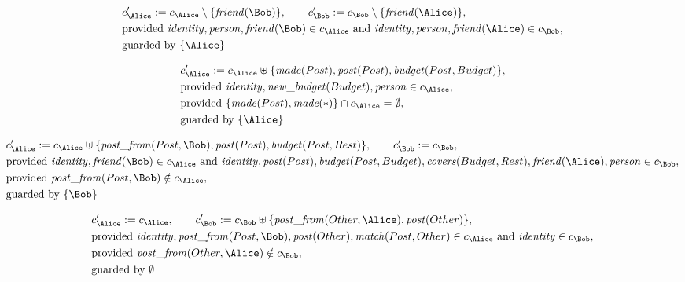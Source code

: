\begin{align*}
&
c'_
{
\Alice
}
 := 
c_
{
\Alice
}
 \setminus 
\{
\mathit{\detokenize{
friend
}}
(
\Bob
)
\}
, \qquad 
c'_
{
\Bob
}
 := 
c_
{
\Bob
}
 \setminus 
\{
\mathit{\detokenize{
friend
}}
(
\Alice
)
\}
,\\
&
\text{provided } 
\mathit{\detokenize{
identity
}}
,
\mathit{\detokenize{
person
}}
,
\mathit{\detokenize{
friend
}}
(
\Bob
)
 \in c_
{
\Alice
}
 \text{ and } 
\mathit{\detokenize{
identity
}}
,
\mathit{\detokenize{
person
}}
,
\mathit{\detokenize{
friend
}}
(
\Alice
)
 \in c_
{
\Bob
}
,\\
&
\text{guarded by } \{
\Alice
\}
\end{align*}

\begin{align*}
&
c'_
{
\Alice
}
 := 
c_
{
\Alice
}
 \uplus 
\{
\mathit{\detokenize{
made
}}
(
Post
)
,
\mathit{\detokenize{
post
}}
(
Post
)
,
\mathit{\detokenize{
budget
}}
(
Post
,
Budget
)
\}
,\\
&
\text{provided } 
\mathit{\detokenize{
identity
}}
,
\mathit{\detokenize{
new_budget
}}
(
Budget
)
,
\mathit{\detokenize{
person
}}
 \in c_
{
\Alice
}
,\\
&
\text{provided } 
\{
\mathit{\detokenize{
made
}}
(
Post
)
,
\mathit{\detokenize{
made
}}
(
\ast
)
\}
 \cap c_
{
\Alice
}
 = \emptyset
,\\
&
\text{guarded by } \{
\Alice
\}
\end{align*}

\begin{align*}
&
c'_
{
\Alice
}
 := 
c_
{
\Alice
}
 \uplus 
\{
\mathit{\detokenize{
post_from
}}
(
Post
,
\Bob
)
,
\mathit{\detokenize{
post
}}
(
Post
)
,
\mathit{\detokenize{
budget
}}
(
Post
,
Rest
)
\}
, \qquad 
c'_
{
\Bob
}
 := 
c_
{
\Bob
}
,\\
&
\text{provided } 
\mathit{\detokenize{
identity
}}
,
\mathit{\detokenize{
friend
}}
(
\Bob
)
 \in c_
{
\Alice
}
 \text{ and } 
\mathit{\detokenize{
identity
}}
,
\mathit{\detokenize{
post
}}
(
Post
)
,
\mathit{\detokenize{
budget
}}
(
Post
,
Budget
)
,
\mathit{\detokenize{
covers
}}
(
Budget
,
Rest
)
,
\mathit{\detokenize{
friend
}}
(
\Alice
)
,
\mathit{\detokenize{
person
}}
 \in c_
{
\Bob
}
,\\
&
\text{provided } 
\mathit{\detokenize{
post_from
}}
(
Post
,
\Bob
)
 \notin c_
{
\Alice
}
,\\
&
\text{guarded by } \{
\Bob
\}
\end{align*}

\begin{align*}
&
c'_
{
\Alice
}
 := 
c_
{
\Alice
}
, \qquad 
c'_
{
\Bob
}
 := 
c_
{
\Bob
}
 \uplus 
\{
\mathit{\detokenize{
post_from
}}
(
Other
,
\Alice
)
,
\mathit{\detokenize{
post
}}
(
Other
)
\}
,\\
&
\text{provided } 
\mathit{\detokenize{
identity
}}
,
\mathit{\detokenize{
post_from
}}
(
Post
,
\Bob
)
,
\mathit{\detokenize{
post
}}
(
Other
)
,
\mathit{\detokenize{
match
}}
(
Post
,
Other
)
 \in c_
{
\Alice
}
 \text{ and } 
\mathit{\detokenize{
identity
}}
 \in c_
{
\Bob
}
,\\
&
\text{provided } 
\mathit{\detokenize{
post_from
}}
(
Other
,
\Alice
)
 \notin c_
{
\Bob
}
,\\
&
\text{guarded by } \emptyset
\end{align*}
